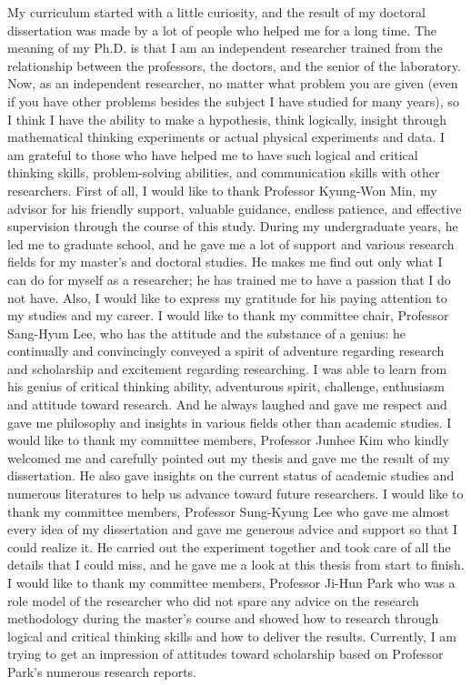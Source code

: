 My curriculum started with a little curiosity, and the result of my doctoral dissertation was made by a lot of people who helped me for a long time. The meaning of my Ph.D. is that I am an independent researcher trained from the relationship between the professors, the doctors, and the senior of the laboratory. Now, as an independent researcher, no matter what problem you are given (even if you have other problems besides the subject I have studied for many years), so I think I have the ability to make a hypothesis, think logically, insight through mathematical thinking experiments or actual physical experiments and data. I am grateful to those who have helped me to have such logical and critical thinking skills, problem-solving abilities, and communication skills with other researchers. 
First of all, I would like to thank Professor Kyung-Won Min, my advisor for his friendly support, valuable guidance, endless patience, and effective supervision through the course of this study. During my undergraduate years, he led me to graduate school, and he gave me a lot of support and various research fields for my master's and doctoral studies. He makes me find out only what I can do for myself as a researcher; he has trained me to have a passion that I do not have. Also, I would like to express my gratitude for his paying attention to my studies and my career. I would like to thank my committee chair, Professor Sang-Hyun Lee, who has the attitude and the substance of a genius: he continually and convincingly conveyed a spirit of adventure regarding research and scholarship and excitement regarding researching. I was able to learn from his genius of critical thinking ability, adventurous spirit, challenge, enthusiasm and attitude toward research. And he always laughed and gave me respect and gave me philosophy and insights in various fields other than academic studies. I would like to thank my committee members, Professor Junhee Kim who kindly welcomed me and carefully pointed out my thesis and gave me the result of my dissertation. He also gave insights on the current status of academic studies and numerous literatures to help us advance toward future researchers. I would like to thank my committee members, Professor Sung-Kyung Lee who gave me almost every idea of my dissertation and gave me generous advice and support so that I could realize it. He carried out the experiment together and took care of all the details that I could miss, and he gave me a look at this thesis from start to finish. I would like to thank my committee members, Professor Ji-Hun Park who was a role model of the researcher who did not spare any advice on the research methodology during the master's course and showed how to research through logical and critical thinking skills and how to deliver the results. Currently, I am trying to get an impression of attitudes toward scholarship based on Professor Park's numerous research reports. 
